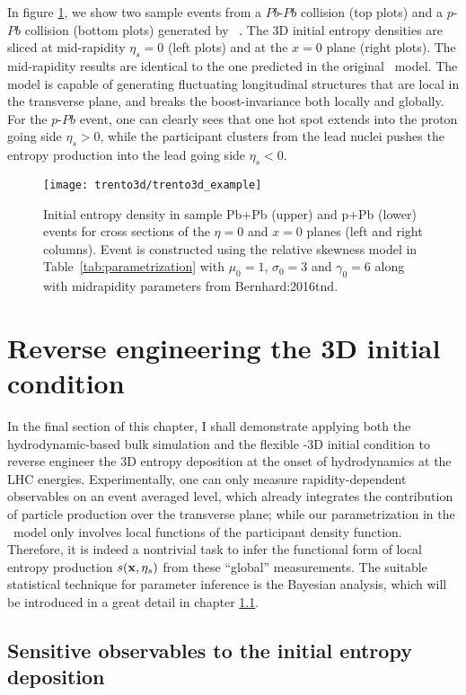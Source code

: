 In figure \ref{fig:3d-example}, we show two sample events from a $Pb$-$Pb$ collision (top plots) and a $p$-$Pb$ collision (bottom plots) generated by \trento\ .
The 3D initial entropy densities are sliced at mid-rapidity $\eta_s=0$ (left plots) and at the $x=0$ plane (right plots).
The mid-rapidity results are identical to the one predicted in the original \trento\ model.
The model is capable of generating fluctuating longitudinal structures that are local in the transverse plane, and breaks the boost-invariance both locally and globally.
For the $p$-$Pb$ event, one can clearly sees that one hot spot extends into the proton going side $\eta_s >0$, while the participant clusters from the lead nuclei pushes the entropy production into the lead going side $\eta_s <0$.

\begin{figure}
\centering
\texttt{[image: trento3d/trento3d\_example]}
\caption{Initial entropy density in sample Pb+Pb (upper) and p+Pb (lower) events for cross sections of the $\eta=0$ and $x=0$ planes (left and right columns). Event is constructed using the relative skewness model in Table~\ref{tab:parametrization} with $\mu_0=1$, $\sigma_0=3$ and $\gamma_0=6$ along with midrapidity parameters from {Bernhard:2016tnd}.}
\label{fig:3d-example}
\end{figure}

\section{Reverse engineering the 3D initial condition}
In the final section of this chapter, I shall demonstrate applying both the hydrodynamic-based bulk simulation and the flexible \trento-3D initial condition to reverse engineer the 3D entropy deposition at the onset of hydrodynamics at the LHC energies.
Experimentally, one can only measure rapidity-dependent observables on an event averaged level, which already integrates the contribution of particle production over the transverse plane; while our parametrization in the \trento\ model only involves local functions of the participant density function.
Therefore, it is indeed a nontrivial task to infer the functional form of local entropy production $s(\mathbf x, \eta_s)$ from these ``global'' measurements.
The suitable statistical technique for parameter inference is the Bayesian 
analysis, which will be introduced in a great detail in chapter \ref{}.

\subsection{Sensitive observables to the initial entropy deposition}
